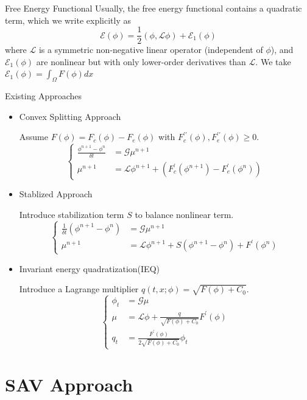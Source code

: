 \documentclass[9pt]{beamer}
\begin{document}
\begin{frame}{Free Energy Functional}
Usually, the free energy functional contains a quadratic term, which we write explicitly as
$$\mathcal{E}(\phi)=\frac{1}{2}(\phi, \mathcal{L} \phi)+\mathcal{E}_{1}(\phi)$$
where $\mathcal L$ is a symmetric non-negative linear operator (independent of $\phi$), and $\mathcal{E}_{1}(\phi)$ are nonlinear but with only lower-order derivatives than $\mathcal L$. We take $\mathcal E_1(\phi) = \int_{\Omega} F(\phi) dx$
\end{frame}

\begin{frame}{Existing Approaches}
\begin{itemize}
\item{Convex Splitting Approach

Assume $F(\phi)= F_c(\phi) - F_e(\phi)$ with $F_{c}^{\prime \prime}(\phi), F_{e}^{\prime \prime}(\phi) \geq 0$.
$$\left\{
\begin{aligned}
\frac{\phi^{n+1}-\phi^{n}}{\delta t}&=\mathcal G \mu^{n+1} \\
\mu^{n+1}&=\mathcal L \phi^{n+1}+\left(F_{c}^{\prime}\left(\phi^{n+1}\right)-F_{e}^{\prime}\left(\phi^{n}\right)\right) 
\end{aligned}
\right.$$
}
\item{Stablized Approach

Introduce stabilization term $S$ to balance nonlinear term.
$$\left\{
\begin{aligned}
\frac{1}{\delta t}\left(\phi^{n+1}-\phi^{n}\right)&=\mathcal G \mu^{n+1} \\
\mu^{n+1}&=\mathcal L \phi^{n+1}+S\left(\phi^{n+1}-\phi^{n}\right)+F^{\prime}\left(\phi^{n}\right)
\end{aligned}
\right.$$
}
\item{Invariant energy quadratization(IEQ)

Introduce  a Lagrange multiplier  $q(t, x ; \phi)=\sqrt{F(\phi)+C_{0}}$.
$$\left\{
\begin{aligned}
\phi_{t} &=\mathcal G \mu \\
\mu &=\mathcal L \phi+\frac{q}{\sqrt{F(\phi)+C_{0}}} F^{\prime}(\phi) \\
q_{t} &=\frac{F^{\prime}(\phi)}{2 \sqrt{F(\phi)+C_{0}}} \phi_{t}
\end{aligned}
\right.$$
}
\end{itemize}
\end{frame}

\section{SAV Approach}
\end{document}
